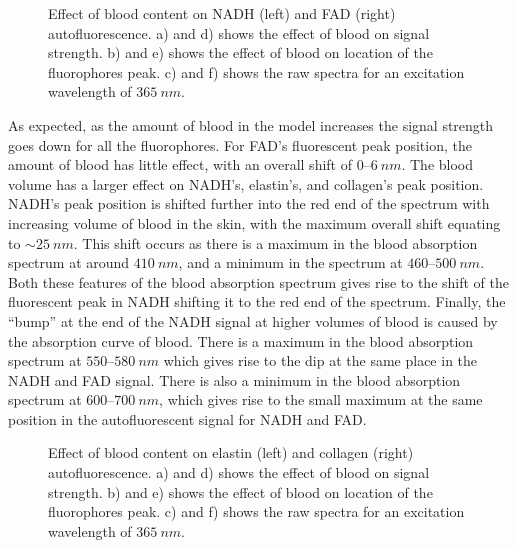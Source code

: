 \begin{figure}[!htbp]
    \centering
    \caption{Effect of blood content on NADH (left) and FAD (right) autofluorescence. a) and d) shows the effect of blood on signal strength. b) and e) shows the effect of blood on location of the fluorophores peak. c) and f) shows the raw spectra for an excitation wavelength of $365~nm$.}%
    \label{fig:nadhfad-blood}%
\end{figure}

As expected, as the amount of blood in the model increases the signal strength goes down for all the fluorophores.
For FAD's fluorescent peak position, the amount of blood has little effect, with an overall shift of $0$--$6~nm$.
The blood volume has a larger effect on NADH's, elastin's, and collagen's peak position.
NADH's peak position is shifted further into the red end of the spectrum with increasing volume of blood in the skin, with the maximum overall shift equating to $\sim25~nm$.
This shift occurs as there is a maximum in the blood absorption spectrum at around $410~nm$, and a minimum in the spectrum at $460$--$500~nm$.
Both these features of the blood absorption spectrum gives rise to the shift of the fluorescent peak in NADH shifting it to the red end of the spectrum.
Finally, the ``bump'' at the end of the NADH signal at higher volumes of blood is caused by the absorption curve of blood.
There is a maximum in the blood absorption spectrum at $550$--$580~nm$ which gives rise to the dip at the same place in the NADH and FAD signal.
There is also a minimum in the blood absorption spectrum at $600$--$700~nm$, which gives rise to the small maximum at the same position in the autofluorescent signal for NADH and FAD.

\begin{figure}[!htbp]
    \centering
    \caption{Effect of blood content on elastin (left) and collagen (right) autofluorescence. a) and d) shows the effect of blood on signal strength. b) and e) shows the effect of blood on location of the fluorophores peak. c) and f) shows the raw spectra for an excitation wavelength of $365~nm$.}%
    \label{fig:elscol-blood}%
\end{figure}


